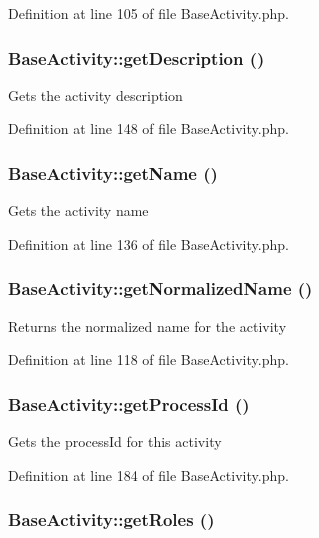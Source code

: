 Definition at line 105 of file Base\-Activity.php.
\subsubsection{\setlength{\rightskip}{0pt plus 5cm}Base\-Activity::get\-Description ()}\label{classBaseActivity_a10}


Gets the activity description 

Definition at line 148 of file Base\-Activity.php.
\subsubsection{\setlength{\rightskip}{0pt plus 5cm}Base\-Activity::get\-Name ()}\label{classBaseActivity_a8}


Gets the activity name 

Definition at line 136 of file Base\-Activity.php.
\subsubsection{\setlength{\rightskip}{0pt plus 5cm}Base\-Activity::get\-Normalized\-Name ()}\label{classBaseActivity_a5}


Returns the normalized name for the activity 

Definition at line 118 of file Base\-Activity.php.
\subsubsection{\setlength{\rightskip}{0pt plus 5cm}Base\-Activity::get\-Process\-Id ()}\label{classBaseActivity_a16}


Gets the process\-Id for this activity 

Definition at line 184 of file Base\-Activity.php.
\subsubsection{\setlength{\rightskip}{0pt plus 5cm}Base\-Activity::get\-Roles ()}\label{classBaseActivity_a19}


